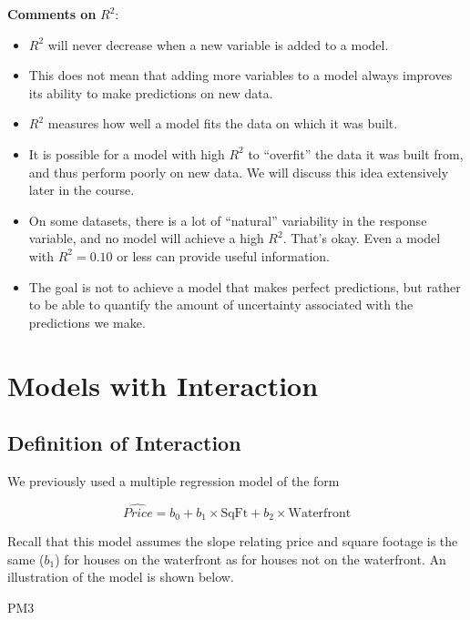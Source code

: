 \documentclass[
  letterpaper,
  DIV=11,
  numbers=noendperiod]{scrreprt}
\newenvironment{Shaded}{\begin{snugshade}}{\end{snugshade}}
\newcommand{\NormalTok}[1]{\textcolor[rgb]{0.00,0.23,0.31}{#1}}
\begin{document}
\textbf{Comments on} \(R^2\):

\begin{itemize}
\item
  \(R^2\) will never decrease when a new variable is added to a model.\\
\item
  This does not mean that adding more variables to a model always
  improves its ability to make predictions on new data.\\
\item
  \(R^2\) measures how well a model fits the data on which it was
  built.\\
\item
  It is possible for a model with high \(R^2\) to ``overfit'' the data
  it was built from, and thus perform poorly on new data. We will
  discuss this idea extensively later in the course.
\item
  On some datasets, there is a lot of ``natural'' variability in the
  response variable, and no model will achieve a high \(R^2\). That's
  okay. Even a model with \(R^2 = 0.10\) or less can provide useful
  information.
\item
  The goal is not to achieve a model that makes perfect predictions, but
  rather to be able to quantify the amount of uncertainty associated
  with the predictions we make.
\end{itemize}

\section{Models with Interaction}\label{models-with-interaction}

\subsection{Definition of Interaction}\label{definition-of-interaction}

We previously used a multiple regression model of the form

\[
\widehat{Price} = b_0 + b_1\times\text{SqFt} + b_2\times\text{Waterfront}
\]

Recall that this model assumes the slope relating price and square
footage is the same (\(b_1\)) for houses on the waterfront as for houses
not on the waterfront. An illustration of the model is shown below.

\begin{Shaded}
\begin{Highlighting}[]
\NormalTok{PM3}
\end{Highlighting}
\end{Shaded}
\end{document}
